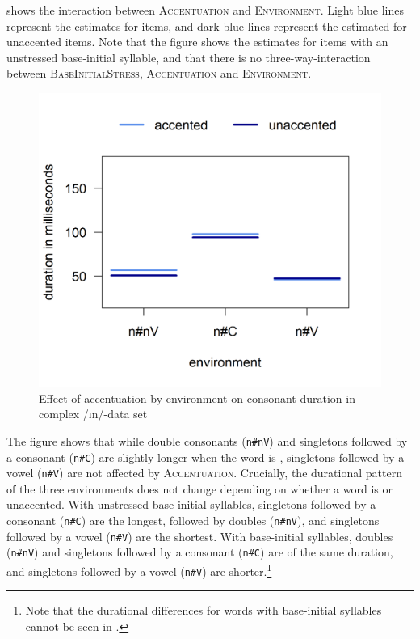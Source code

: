  	
 

 shows the interaction between \textsc{Accentuation} and \textsc{Environment}. Light blue lines represent the estimates for  items, and dark blue lines represent the estimated for unaccented items. Note that the figure shows the estimates for items with an unstressed base-initial syllable, and that there is no three-way-interaction between \textsc{BaseInitialStress}, \textsc{Accentuation} and \textsc{Environment}. 


	


	\begin{figure} 
		
		\includegraphics [scale=0.5] {images/Experiment/InModelInterEnvAcc}
		\caption{Effect of accentuation by environment on consonant duration in complex /ɪn/-data set}
		\label{fig:Env Acc In experiment} 
	\end{figure}






The figure shows that while double consonants (\texttt{n\#nV}) and singletons followed by a consonant (\texttt{n\#C}) are slightly longer when the word is , singletons followed by a vowel (\texttt{n\#V}) are not affected by \textsc{Accentuation}. Crucially, 
the durational pattern of the three environments does not change depending on whether a word is  or unaccented. 
With unstressed base-initial syllables, singletons followed by a consonant (\texttt{n\#C}) are the longest, followed by doubles (\texttt{n\#nV}), and singletons followed by a vowel (\texttt{n\#V}) are the shortest.
With  base-initial syllables, doubles (\texttt{n\#nV}) and singletons followed by a consonant (\texttt{n\#C}) are of the same duration, and singletons followed by a vowel (\texttt{n\#V}) are shorter.\footnote{Note that the durational differences for words with  base-initial syllables cannot be seen in .}


